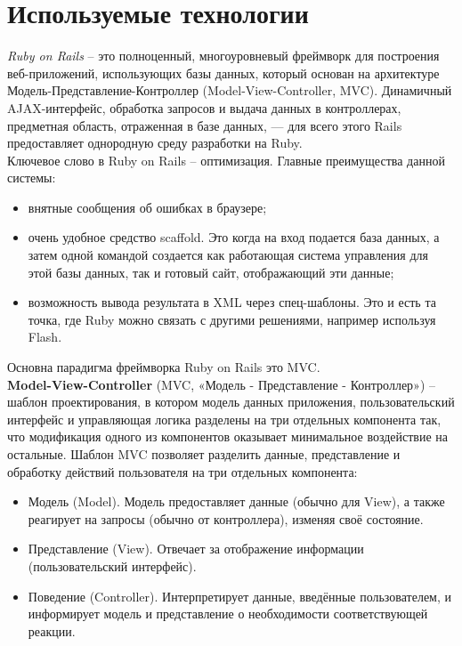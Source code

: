 \section{Используемые технологии}
\hspace*{0.5cm}\textit{Ruby on Rails} -- это полноценный, многоуровневый фреймворк для построения веб-приложений, использующих базы данных, который основан на архитектуре Модель-Представление-Контроллер (Model-View-Controller, MVC). Динамичный AJAX-интерфейс, обработка запросов и выдача данных в контроллерах, предметная область, отраженная в базе данных, — для всего этого Rails предоставляет однородную среду разработки на Ruby.\\
Ключевое слово в Ruby on Rails -- оптимизация. Главные преимущества данной системы:\\
\begin{itemize}
\item внятные сообщения об ошибках в браузере;\\
\item очень удобное средство scaffold. Это когда на вход подается база данных, а затем одной командой создается как работающая система управления для этой базы данных, так и готовый сайт, отображающий эти данные;\\
\item возможность вывода результата в XML через спец-шаблоны. Это и есть та точка, где Ruby можно связать с другими решениями, например используя Flash.\\
\end{itemize}
Основна парадигма фреймворка Ruby on Rails это MVC. \\ 
\textbf{Model-View-Controller} (MVC, «Модель - Представление - Контроллер») -- шаблон проектирования, в котором модель данных приложения, пользовательский интерфейс и управляющая логика разделены на три отдельных компонента так, что модификация одного из компонентов оказывает минимальное воздействие на остальные. Шаблон MVC позволяет разделить данные, представление и обработку действий пользователя на три отдельных компонента:
\begin{itemize}
\item Модель (Model). Модель предоставляет данные (обычно для View), а также реагирует на запросы (обычно от контроллера), изменяя своё состояние.
\item Представление (View). Отвечает за отображение информации (пользовательский интерфейс).
\item Поведение (Controller). Интерпретирует данные, введённые пользователем, и информирует модель и представление о необходимости соответствующей реакции.
\end{itemize}
